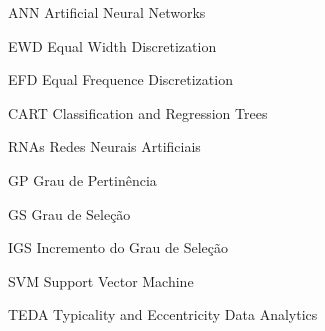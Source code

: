 \documentclass[
	12pt,					%
	openany,				%
	twoside,					%
	a4paper,					%
	english,					%
	brazil					%
	]{abntex2}
\begin{document}
\frenchspacing

\pretextual



\imprimirfolhaderosto*





%

%

%



\listoffigures*
\cleardoublepage

\listoftables*
\cleardoublepage

\begin{siglas}
  \item [ANN] Artificial Neural Networks
  \item[EWD] Equal Width Discretization
  \item[EFD] Equal Frequence Discretization
  \item[CART] Classification and Regression Trees
  \item[RNAs] Redes Neurais Artificiais
  \item[GP] Grau de Pertinência
  \item[GS] Grau de Seleção
  \item[IGS] Incremento do Grau de Seleção
  \item[SVM] Support Vector Machine
  \item[TEDA] Typicality and Eccentricity Data Analytics
\end{siglas}

\end{document}
